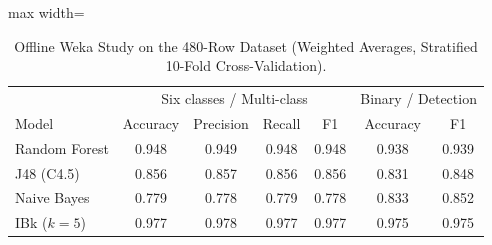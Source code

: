 \documentclass[manuscript,screen]{acmart}
\begin{document}
\begin{table}[tbp]
\centering
\small
\caption{Offline Weka Study on the 480-Row Dataset (Weighted Averages, Stratified 10-Fold Cross-Validation).}
\label{tab:ml}
\begin{adjustbox}{max width=\textwidth}
\begin{tabular}{l c c c c c c}
\toprule
 & \multicolumn{4}{c}{Six classes / Multi-class} & \multicolumn{2}{c}{Binary / Detection} \\
Model & Accuracy & Precision & Recall & F1 & Accuracy & F1 \\
\midrule
Random Forest & 0.948 & 0.949 & 0.948 & 0.948 & 0.938 & 0.939 \\
J48 (C4.5)    & 0.856 & 0.857 & 0.856 & 0.856 & 0.831 & 0.848 \\
Naive Bayes   & 0.779 & 0.778 & 0.779 & 0.778 & 0.833 & 0.852 \\
IBk ($k=5$)   & 0.977 & 0.978 & 0.977 & 0.977 & 0.975 & 0.975 \\
\bottomrule
\end{tabular}
\end{adjustbox}
\end{table}
\end{document}
